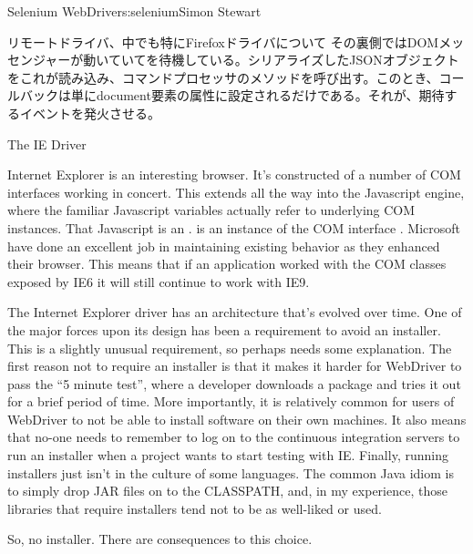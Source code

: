 \begin{aosachapter}{Selenium WebDriver}{s:selenium}{Simon Stewart}
\begin{aosasect1}{リモートドライバ、中でも特にFirefoxドライバについて}
その裏側ではDOMメッセンジャーが動いていてを待機している。シリアライズしたJSONオブジェクトをこれが読み込み、コマンドプロセッサのメソッドを呼び出す。このとき、コールバックは単にdocument要素の属性に設定されるだけである。それが、期待するイベントを発火させる。

\end{aosasect1}

\begin{aosasect1}{The IE Driver}

Internet Explorer is an interesting browser. It's constructed of a
number of COM interfaces working in concert. This extends all the way
into the Javascript engine, where the familiar Javascript variables
actually refer to underlying COM instances. That Javascript
 is an .   is an
instance of the COM interface . Microsoft have
done an excellent job in maintaining existing behavior as they
enhanced their browser. This means that if an application worked with
the COM classes exposed by IE6 it will still continue to work with
IE9.

The Internet Explorer driver has an architecture that's evolved over
time. One of the major forces upon its design has been a requirement
to avoid an installer. This is a slightly unusual requirement, so
perhaps needs some explanation. The first reason not to require an
installer is that it makes it harder for WebDriver to pass the ``5
minute test'', where a developer downloads a package and tries it out
for a brief period of time. More importantly, it is relatively common
for users of WebDriver to not be able to install software on their own
machines. It also means that no-one needs to remember to log on to the
continuous integration servers to run an installer when a project
wants to start testing with IE\@. Finally, running installers just isn't
in the culture of some languages. The common Java idiom is to simply
drop JAR files on to the CLASSPATH, and, in my experience, those
libraries that require installers tend not to be as well-liked or
used.

So, no installer. There are consequences to this choice.


\end{aosasect1}
\end{aosachapter}
